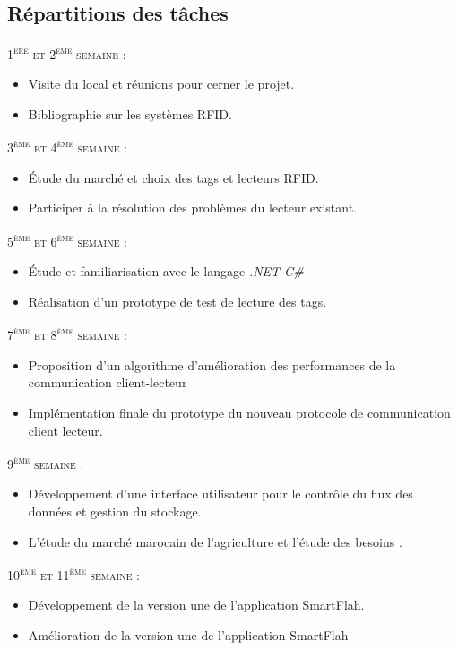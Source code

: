 \documentclass[11pt, a4paper, twoside]{book}
\begin{document}
\subsection{Répartitions des tâches}
\noindent
\textsc{1\textsuperscript{ère} et 2\textsuperscript{ème} semaine :}
\begin{itemize}
\item Visite du local et réunions pour cerner le projet.
\item Bibliographie sur les systèmes RFID.
\end{itemize}
\textsc{3\textsuperscript{ème} et 4\textsuperscript{ème} semaine :}
\begin{itemize}
\item Étude du marché et choix des tags et lecteurs RFID.
\item Participer à la résolution des problèmes du lecteur existant.
\end{itemize}
\textsc{5\textsuperscript{ème} et 6\textsuperscript{ème} semaine :}
\begin{itemize}
\item Étude et familiarisation avec le langage \emph{.NET  C\#}
\item Réalisation d'un prototype de test de lecture des tags.
\end{itemize}
\textsc{7\textsuperscript{ème} et 8\textsuperscript{ème} semaine :}
\begin{itemize}
\item Proposition d'un algorithme d'amélioration des performances de la communication client-lecteur
\item Implémentation finale du prototype du nouveau protocole de communication client lecteur.
\end{itemize}
\textsc{9\textsuperscript{ème} semaine :}  
\begin{itemize}
\item Développement d'une interface utilisateur pour le contrôle du flux des données et gestion du stockage.
\item L'étude du marché marocain de l'agriculture et l'étude des besoins .
\end{itemize}
\textsc{10\textsuperscript{ème} et 11\textsuperscript{ème} semaine :}
\begin{itemize}
\item Développement de la version une de l'application SmartFlah.
\item Amélioration de la version une de l'application SmartFlah
\end{itemize}
\end{document}
